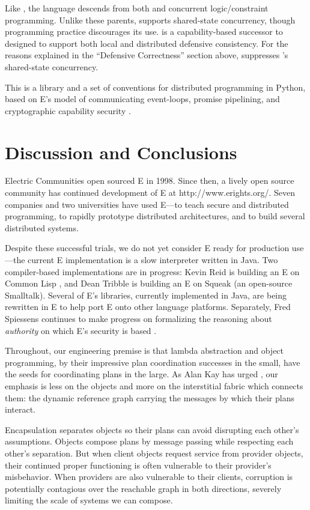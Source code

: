 \documentclass{llncs}
\begin{document}
 Like , the  language
\cite{VanRoyHaridi} descends from both  and concurrent
logic/constraint programming. Unlike these parents,  supports
shared-state concurrency, though  programming practice
discourages its use.  \cite{oze} is a capability-based
successor to  designed to support both local and distributed
defensive consistency. For the reasons explained in the ``Defensive
Correctness'' section above,  suppresses 's
shared-state concurrency.

 This is a library and a set of
conventions for distributed programming in Python, based on E's model
of communicating event-loops, promise pipelining, and cryptographic
capability security \cite{twisted}.

\section{Discussion and Conclusions}

Electric Communities open sourced E in 1998. Since then, a lively open
source community has continued development of E at
http://www.erights.org/. Seven companies and two universities have
used E---to teach secure and distributed programming, to rapidly
prototype distributed architectures, and to build several distributed
systems.

Despite these successful trials, we do not yet consider E ready for
production use---the current E implementation is a slow interpreter
written in Java.  Two compiler-based implementations are in progress:
Kevin Reid is building an E on Common Lisp \cite{reid:e-on-cl}, and
Dean Tribble is building an E on Squeak (an open-source
Smalltalk). Several of E's libraries, currently implemented in Java,
are being rewritten in E to help port E onto other language
platforms. Separately, Fred Spiessens continues to make progress on
formalizing the reasoning about \emph{authority} on which E's security
is based \cite{tgc}.

Throughout, our engineering premise is that lambda abstraction and
object programming, by their impressive plan coordination successes in
the small, have the seeds for coordinating plans in the large. As Alan
Kay has urged \cite{kay:ma}, our emphasis is less on the objects and
more on the interstitial fabric which connects them: the dynamic
reference graph carrying the messages by which their plans interact.

Encapsulation separates objects so their plans can avoid disrupting
each other's assumptions. Objects compose plans by message passing
while respecting each other's separation.  But when client objects
request service from provider objects, their continued proper
functioning is often vulnerable to their provider's misbehavior. When
providers are also vulnerable to their clients, corruption is
potentially contagious over the reachable graph in both directions,
severely limiting the scale of systems we can compose.
\end{document}
